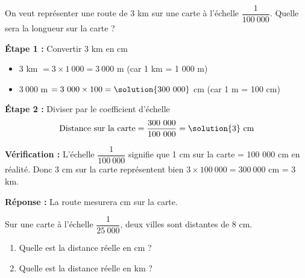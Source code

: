 \begin{examplebox}
	On veut représenter une route de 3 km sur une carte à l'échelle $\dfrac{1}{100~000}$. Quelle sera la longueur sur la carte ?

	\textbf{Étape 1 :} Convertir 3 km en cm
	\begin{itemize}
		\item $3$ km $= 3 \times 1~000 = 3~000$ m (car 1 km = 1 000 m)
		\item $3~000$ m $= 3~000 \times 100 = \solution{300~000}$ cm (car 1 m = 100 cm)
	\end{itemize}

	\textbf{Étape 2 :} Diviser par le coefficient d'échelle
	$$\text{Distance sur la carte} = \dfrac{300~000}{100~000} = \solution{3}~\text{cm}$$

	\textbf{Vérification :} L'échelle $\dfrac{1}{100~000}$ signifie que 1 cm sur la carte = 100 000 cm en réalité. Donc 3 cm sur la carte représentent bien $3 \times 100~000 = 300~000$ cm = 3 km.

	\textbf{Réponse :} La route mesurera  cm sur la carte.
\end{examplebox}

\begin{exercisebox}[Application]
	Sur une carte à l'échelle $\dfrac{1}{25~000}$, deux villes sont distantes de 8 cm.

	\begin{enumerate}
		\item Quelle est la distance réelle en cm ?


		\item Quelle est la distance réelle en km ?

	\end{enumerate}
\end{exercisebox}

